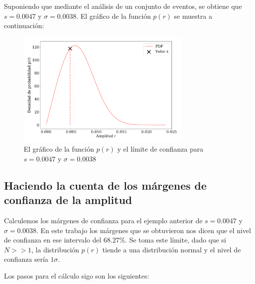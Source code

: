 Suponiendo que mediante el análisis de un conjunto de eventos, se obtiene que $s=0.0047$ y $\sigma=0.0038$. El gráfico de la función $p(r)$ se muestra a continuación:

\begin{figure}[H]
    \begin{small}
        \begin{center}
            \includegraphics[width=0.75\textwidth]{bessel_prob_value_s_v2.pdf}
        \end{center}
        \caption{El gráfico de la función $p(r)$ y el límite de confianza para $s=0.0047$ y $\sigma=0.0038$ }
    \end{small}
\end{figure}

\subsection{Haciendo la cuenta de los márgenes de confianza de la amplitud}

Calculemos los márgenes de confianza para el ejemplo anterior de $s=0.0047$ y $\sigma=0.0038$. En este trabajo los márgenes que se obtuvieron nos dicen que el nivel de confianza en ese intervalo del $68.27\%$. Se toma este límite, dado que si $N>>1$, la distribución $p(r)$ tiende a una distribución normal y el nivel de confianza sería $1\sigma$.

Los pasos para el cálculo sigo son los siguientes: 

